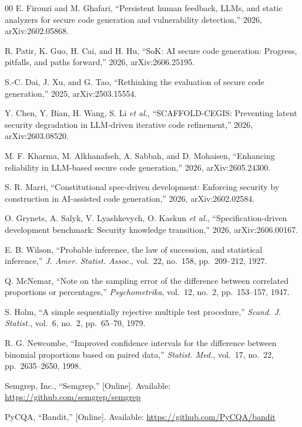 \documentclass[conference]{IEEEtran}
\begin{document}
\begin{thebibliography}{00}
 E. Firouzi and M. Ghafari, ``Persistent human feedback,
LLMs, and static analyzers for secure code generation and vulnerability
detection,'' 2026, arXiv:2602.05868.

 R. Patir, K. Guo, H. Cai, and H. Hu, ``SoK: AI secure code
generation: Progress, pitfalls, and paths forward,'' 2026, arXiv:2606.25195.

 S.-C. Dai, J. Xu, and G. Tao, ``Rethinking the evaluation of
secure code generation,'' 2025, arXiv:2503.15554.

 Y. Chen, Y. Bian, H. Wang, S. Li \textit{et al.},
``SCAFFOLD-CEGIS: Preventing latent security degradation in LLM-driven
iterative code refinement,'' 2026, arXiv:2603.08520.

 M. F. Kharma, M. Alkhanafseh, A. Sabbah, and D. Mohaisen,
``Enhancing reliability in LLM-based secure code generation,'' 2026,
arXiv:2605.24300.

 S. R. Marri, ``Constitutional spec-driven development:
Enforcing security by construction in AI-assisted code generation,'' 2026,
arXiv:2602.02584.

 O. Grynets, A. Salyk, V. Lyashkevych, O. Kaskun
\textit{et al.}, ``Specification-driven development benchmark: Security
knowledge transition,'' 2026, arXiv:2606.00167.

 E. B. Wilson, ``Probable inference, the law of succession,
and statistical inference,'' \textit{J. Amer. Statist. Assoc.}, vol.~22,
no.~158, pp.~209--212, 1927.

 Q. McNemar, ``Note on the sampling error of the difference
between correlated proportions or percentages,'' \textit{Psychometrika},
vol.~12, no.~2, pp.~153--157, 1947.

 S. Holm, ``A simple sequentially rejective multiple test
procedure,'' \textit{Scand. J. Statist.}, vol.~6, no.~2, pp.~65--70, 1979.

 R. G. Newcombe, ``Improved confidence intervals for the
difference between binomial proportions based on paired data,''
\textit{Statist. Med.}, vol.~17, no.~22, pp.~2635--2650, 1998.

 Semgrep, Inc., ``Semgrep,'' [Online]. Available:
\url{https://github.com/semgrep/semgrep}

 PyCQA, ``Bandit,'' [Online]. Available:
\url{https://github.com/PyCQA/bandit}


\end{thebibliography}
\end{document}
